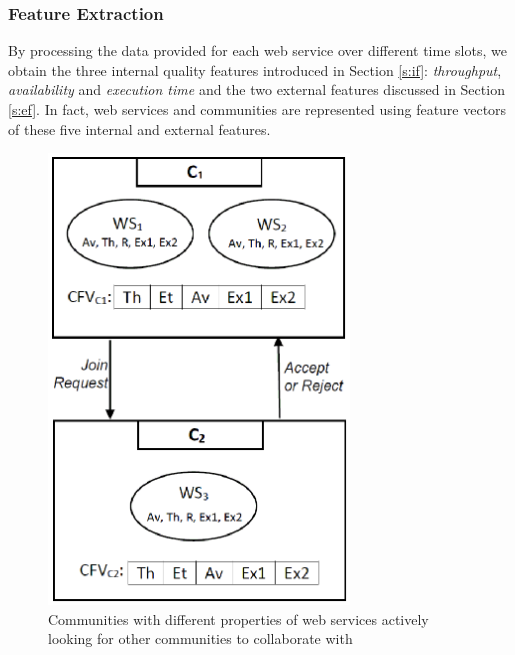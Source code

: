 \subsubsection{Feature Extraction}\label{sss:filtereddata}

By processing the data provided for each web service over different time slots, we obtain the three internal quality features introduced in Section \ref{s:if}: \emph{throughput}, \emph{availability} and \emph{execution time} and the two external features discussed in Section \ref{s:ef}.  In fact, web services and communities are represented using feature vectors of these five internal and external features.


\begin{figure}%
\centerline{\includegraphics[width=3.15in]{figures/cfvs.eps}}
\caption{Communities with different properties of web services actively looking for other communities to collaborate with}
\label{fig_community}
\end{figure}



